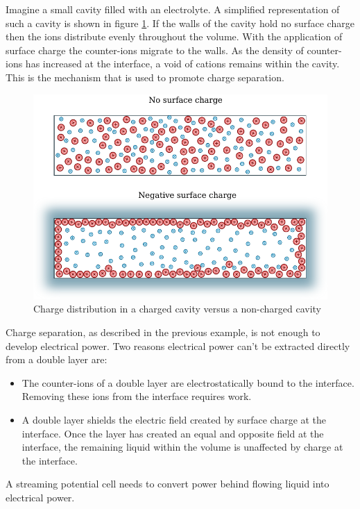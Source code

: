Imagine a small cavity filled with an electrolyte.
A simplified representation of such a cavity is shown in figure \ref{fig:ionsInABox}.
If the walls of the cavity hold no surface charge then the ions distribute evenly throughout the volume.
With the application of surface charge the counter-ions migrate to the walls.
As the density of counter-ions has increased at the interface, a void of cations remains within the cavity.
This is the mechanism that is used to promote charge separation.

\begin{figure}
    \centering
    \includegraphics{content/pt1/01-PowerHarvesting/graphics/ionsInABox}
    \caption{\label{fig:ionsInABox}Charge distribution in a charged cavity versus a non-charged cavity}
\end{figure}

Charge separation, as described in the previous example, is not enough to develop electrical power.
Two reasons electrical power can't be extracted directly from a double layer are:
\begin{itemize}
    \item The counter-ions of a double layer are electrostatically bound to the interface.
        Removing these ions from the interface requires work.
    \item A double layer shields the electric field created by surface charge at the interface.
        Once the layer has created an equal and opposite field at the interface, the remaining liquid within the volume is unaffected by charge at the interface.
\end{itemize}

A streaming potential cell needs to convert power behind flowing liquid into electrical power.



